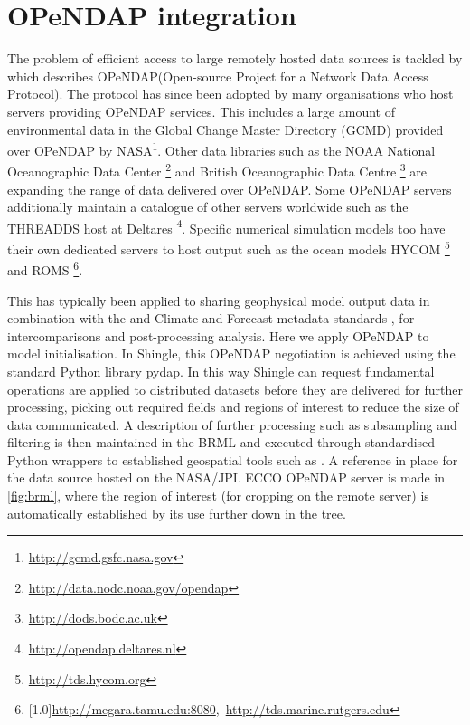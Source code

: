 \documentclass[a4paper, 10pt]{book}
\providecommand{\shingle}{Shingle\xspace}
\providecommand{\opendap}{OPeNDAP\xspace}
\providecommand{\brml}{BRML\xspace}
\begin{document}
\section{\opendap integration}
\label{sec:opendap}
%
%
The problem of efficient access to large remotely hosted data sources is tackled by 
\cite{cornillon03} which describes \opendap (Open-source Project for a Network Data Access Protocol).
The protocol has since been adopted by many organisations
who host servers providing \opendap services.
This includes a large amount of environmental data in
the Global Change Master Directory (GCMD) 
provided
over \opendap
by NASA\footnote{\url{http://gcmd.gsfc.nasa.gov}}.
%
Other data libraries such as the NOAA National Oceanographic Data Center%
\footnote{\url{http://data.nodc.noaa.gov/opendap}}
% 
and 
British Oceanographic Data Centre%
\footnote{\url{http://dods.bodc.ac.uk}}
are expanding the range of data delivered over \opendap. 
%
Some \opendap servers additionally maintain a catalogue of other servers worldwide
such as the THREADDS host at Deltares%
\footnote{\url{http://opendap.deltares.nl}}.
%
Specific numerical simulation models too have their own dedicated servers to host output such as
the ocean models HYCOM%
\footnote{\url{http://tds.hycom.org}}
and 
ROMS%
\footnote{\scalebox{0.97}[1.0]{\url{http://megara.tamu.edu:8080},~\url{http://tds.marine.rutgers.edu}}}.
%


This has typically been applied to sharing geophysical model output data in combination with 
the \citep[NetCDF][]{netcdf} and Climate and Forecast \citep[CF,][]{gregory03} metadata standards \citep{hankin10},
for intercomparisons and post-processing analysis.
Here we apply \opendap to model initialisation.
%
%
In \shingle, this \opendap negotiation is achieved using the standard Python library pydap.
In this way \shingle can request fundamental operations 
%
are applied to distributed datasets before they are delivered for further processing,
picking out required fields and regions of interest to reduce the size of data communicated.
%
A description of further processing such as subsampling and filtering is then maintained in the \brml and 
executed through standardised Python wrappers to established geospatial tools such as \cite{gdal}.
%
A reference in place for the \cite{gebco} data source hosted on the NASA/JPL ECCO \opendap server
is made in \cref{fig:brml},
where the region of interest
(for cropping on the remote server)
is automatically established by its use further down in the tree.
%
\end{document}
